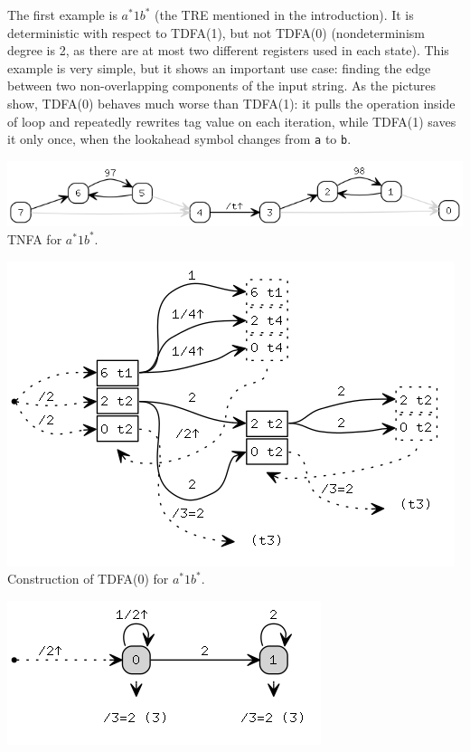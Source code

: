 \documentclass{article}
\theoremstyle{definition}
\begin{document}
\begin{multicols}{2}
The first example is $a^* 1 b^*$ (the TRE mentioned in the introduction).
It is deterministic with respect to TDFA(1), but not TDFA(0)
(nondeterminism degree is 2, as there are at most two different registers used in each state).
This example is very simple, but it shows an important use case:
finding the edge between two non-overlapping components of the input string.
As the pictures show, TDFA(0) behaves much worse than TDFA(1):
it pulls the operation inside of loop and repeatedly rewrites tag value on each iteration,
while TDFA(1) saves it only once, when the lookahead symbol changes from \texttt{a} to \texttt{b}.
\begin{center}
\includegraphics[width=\linewidth]{img/example1/tnfa.png}\\
\footnotesize{TNFA for $a^* 1 b^*$.} \\
\end{center}
\begin{center}
\includegraphics[width=0.8\linewidth]{img/example1/tdfa0_raw.png}\\
\footnotesize{Construction of TDFA(0) for $a^* 1 b^*$.} \\
\end{center}
\begin{center}
\includegraphics[width=0.6\linewidth]{img/example1/tdfa0.png}\\

\end{center}
\end{multicols}
\end{document}
